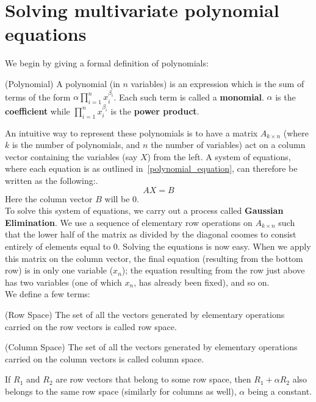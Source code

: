\section{Solving multivariate polynomial equations}
We begin by giving a formal definition of polynomials:
\begin{definition} (Polynomial)
A polynomial (in $n$ variables) is an expression which is the sum of terms of the form $ \alpha\prod\limits_{i=1}^{n} x_i^{\beta_i}$. Each such term is called a \textbf{monomial}. $\alpha$ is the \textbf{coefficient} while $\prod\limits_{i=1}^{n} x_i^{\beta_i}$ is the \textbf{power product}.
\end{definition}
An intuitive way to represent these polynomials is to have a matrix $A_{k \times n}$ (where $k$ is the number of polynomials, and $n$ the number of variables) act on a column vector containing the variables (say $X$) from the left. A system of equations, where each equation is as outlined in~\ref{polynomial_equation}, can therefore be written as the following:.\\
\[
AX = B
\]
Here the column vector $B$ will be 0.\\
To solve this system of equations, we carry out a process called \textbf{Gaussian Elimination}. We use a sequence of elementary row operations on $A_{k \times n}$ such that the lower half of the matrix as divided by the diagonal coomes to consist entirely of elements equal to 0. Solving the equations is now easy. When we apply this matrix on the column vector, the final equation (resulting from the bottom row) is in only one variable ($x_n$); the equation resulting from the row just above has two variables (one of which $x_n$, has already been fixed), and so on.\\
We define a few terms:\\

\begin{definition} (Row Space)
The set of all the vectors generated by elementary operations carried on the row vectors is called row space.
\end{definition}

\begin{definition} (Column Space)
The set of all the vectors generated by elementary operations carried on the column vectors is called column space.
\end{definition}

\begin{example}\label{row_space_example}
If $R_1$ and $R_2$ are row vectors that belong to some row space, then $R_1 + \alpha R_2$ also belongs to the same row space (similarly for columns as well), $\alpha$ being a constant.
\end{example}

